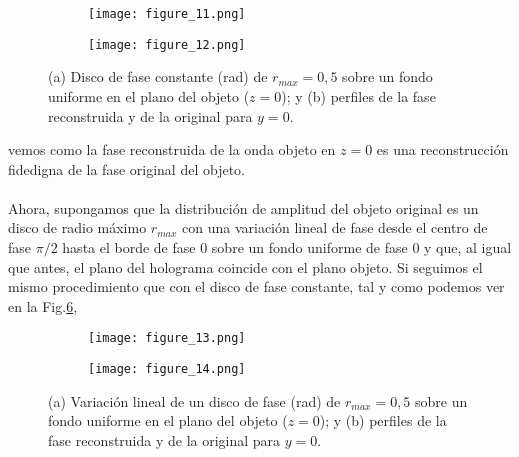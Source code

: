 \documentclass[12pt]{article}
\begin{document}
\begin{figure}[t!]
\centering
\begin{center}
    \begin{subfigure}[b]{0.45\textwidth}
        \texttt{[image: figure\_11.png]}
        \caption{}
        \label{f8a}
    \end{subfigure}
    \begin{subfigure}[b]{0.45\textwidth}
        \texttt{[image: figure\_12.png]}
        \caption{}
        \label{f8b}
    \end{subfigure}
    \caption{(a) Disco de fase constante (rad) de $r_{max}=0,5$ sobre un fondo uniforme en el plano del objeto ($z=0$); y (b) perfiles de la fase reconstruida y  de la original para $y = 0$.}
    \label{figura8}
\end{center}
\end{figure}
vemos como la fase reconstruida de la onda objeto en $z=0$ es una reconstrucción fidedigna de la fase original del objeto. \\ \\
Ahora,  supongamos que la distribución de amplitud del objeto original es un disco de radio máximo $r_{max}$ con una variación lineal de fase desde el centro de fase $\pi/2$ hasta el borde de fase $0$ sobre un fondo uniforme de fase $0$ y que, al igual que antes, el plano del holograma coincide con el plano objeto. Si seguimos el mismo procedimiento que con el disco de fase constante, tal y como podemos ver  en la Fig.\ref{figura9}, 
\begin{figure}[b!]
\centering
\begin{center}
    \begin{subfigure}[b]{0.45\textwidth}
    \texttt{[image: figure\_13.png]}
    \caption{}
    \label{f9a}
    \end{subfigure}
    \hspace{10pt}
    \begin{subfigure}[b]{0.45\textwidth}
    \texttt{[image: figure\_14.png]}
    \caption{}
    \label{f9b}
    \end{subfigure}
    \caption{(a) Variación lineal de un disco de fase (rad) de $r_{max}=0,5$ sobre un fondo uniforme en el plano del objeto ($z=0$);  y (b) perfiles de la fase reconstruida y  de la original para $y = 0$.}
    \label{figura9}
\end{center}
\end{figure}
\end{document}
